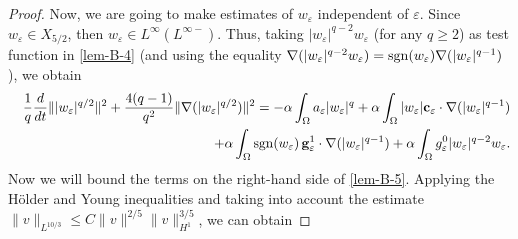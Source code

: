 \documentclass[11pt,reqno]{amsart}%
\numberwithin{equation}{section}
\begin{document}
{\begin{proof}
 Now, we are going to make estimates of $w_\varepsilon$ independent of $\varepsilon$. 
 Since $w_\varepsilon\in X_{5/2}$, then $w_\varepsilon \in L^\infty(L^{\infty-})$. 
 Thus, taking $|w_\varepsilon|^{q-2}w_\varepsilon$ (for any $q\ge 2$) as test function in \eqref{lem-B-4} (and using the equality $\nabla ( |w_\varepsilon|^{q-2}w_\varepsilon) = {\rm sgn} (w_\varepsilon)\nabla (|w_\varepsilon|^{q-1})$), %
 we obtain
 \begin{eqnarray}
 &&\frac1q\frac{d}{dt}\||w_\varepsilon|^{q/2}\|^2+\frac{4(q-1)}{q^2}\|\nabla(|w_\varepsilon|^{q/2})\|^2
 = -\alpha\int_\Omega a_{\varepsilon} |w_\varepsilon|^q
 +\alpha\int_\Omega |w_\varepsilon| {\bf c}_\varepsilon \cdot \nabla (|w_\varepsilon|^{q-1})\nonumber\\
 && \quad+ \alpha\int_\Omega {\rm sgn} (w_\varepsilon)\, {\bf g}^1_\varepsilon\cdot\nabla(|w_\varepsilon|^{q-1})+\alpha\int_\Omega g^0_\varepsilon|w_\varepsilon|^{q-2}w_\varepsilon.\label{lem-B-5}
 \end{eqnarray}
 Now we will bound the terms on the right-hand side of \eqref{lem-B-5}. Applying the H\"older and Young inequalities and taking into account the estimate $\|v\|_{L^{10/3}}\le C\|v\|^{2/5}\|v\|^{3/5}_{H^1}$, we can obtain
 

\end{proof}}
\end{document}
